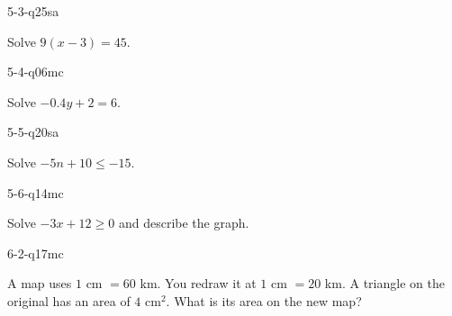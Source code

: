 \begin{practiceQuestion}{5-3-q25}{sa}
\begin{questionText}
Solve $9(x - 3) = 45$.
\end{questionText}
\end{practiceQuestion}

\begin{practiceQuestion}{5-4-q06}{mc}
\begin{questionText}
Solve $-0.4y + 2 = 6$.
\end{questionText}
\end{practiceQuestion}

\begin{practiceQuestion}{5-5-q20}{sa}
\begin{questionText}
Solve $-5n + 10 \leq -15$.
\end{questionText}
\end{practiceQuestion}

\begin{practiceQuestion}{5-6-q14}{mc}
\begin{questionText}
Solve $-3x + 12 \geq 0$ and describe the graph.
\end{questionText}
\end{practiceQuestion}

\begin{practiceQuestion}{6-2-q17}{mc}
\begin{questionText}
A map uses $1$ cm $= 60$ km. You redraw it at $1$ cm $= 20$ km. A triangle on the original has an area of $4$ cm$^2$. What is its area on the new map?
\end{questionText}
\end{practiceQuestion}

